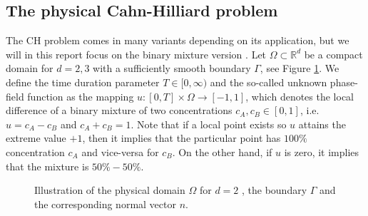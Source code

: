 \documentclass[11pt]{article}
\theoremstyle{remark}
\numberwithin{equation}{section}
\begin{document}
\subsection{The physical Cahn-Hilliard problem}%
\label{sub:the_equations}

The CH problem comes in many variants depending on its application, but we will in this report focus on the binary mixture version \cite{miranville2017cahn}. Let $\Omega \subset  \mathbb{R} ^{d} $ be a compact domain for $d=2,3$ with a sufficiently smooth boundary
$\Gamma $,  see Figure \ref{fig:domain_construction}. We define the time duration parameter $T \in  [0,\infty) $ and the
so-called unknown phase-field function as the
mapping $u: \left[ 0, T \right] \times \Omega  \to \left[ -1,1 \right]  $, which denotes the local difference of a binary mixture of two concentrations $c_{A}, c_{B} \in \left[ 0,1\right] $, i.e. $u = c_{A} -c_{B}$ and $c_{A} + c_{B} = 1$. Note that
if a local point exists so $u$ attains the extreme value $+1$, then it implies that the particular point has $100\%$ concentration $c_{A}$ and vice-versa for $c_{B}$. On the other hand, if $u$ is zero, it implies that the mixture is $50\% - 50\%$.

\begin{figure}[htpb!]
    \centering
    \caption{Illustration of the physical domain $\Omega$ for $d=2$ , the boundary $\Gamma$ and the corresponding normal vector $n$.}
    \label{fig:domain_construction}
\end{figure}
\end{document}
